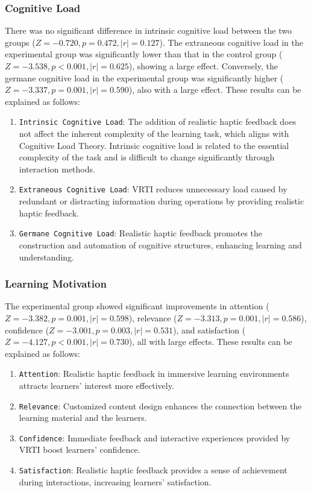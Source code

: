 \documentclass[runningheads]{llncs}
\begin{document}
\subsubsection{Cognitive Load}
There was no significant difference in intrinsic cognitive load between the two groups ($Z=-0.720, p=0.472, |r|=0.127$). The extraneous cognitive load in the experimental group was significantly lower than that in the control group ($Z=-3.538, p<0.001, |r|=0.625$), showing a large effect. Conversely, the germane cognitive load in the experimental group was significantly higher ($Z=-3.337, p=0.001, |r|=0.590$), also with a large effect. These results can be explained as follows:

\begin{enumerate}
\item {\texttt{Intrinsic Cognitive Load}}: The addition of realistic haptic feedback does not affect the inherent complexity of the learning task, which aligns with Cognitive Load Theory. Intrinsic cognitive load is related to the essential complexity of the task and is difficult to change significantly through interaction methods.

\item {\texttt{Extraneous Cognitive Load}}: VRTI reduces unnecessary load caused by redundant or distracting information during operations by providing realistic haptic feedback.

\item {\texttt{Germane Cognitive Load}}: Realistic haptic feedback promotes the construction and automation of cognitive structures, enhancing learning and understanding.
\end{enumerate}

\subsubsection{Learning Motivation}
The experimental group showed significant improvements in attention ($Z=-3.382, p=0.001, |r|=0.598$), relevance ($Z=-3.313, p=0.001, |r|=0.586$), confidence ($Z=-3.001, p=0.003, |r|=0.531$), and satisfaction ($Z=-4.127, p<0.001, |r|=0.730$), all with large effects. These results can be explained as follows:

\begin{enumerate}
  \item {\texttt{Attention}}: Realistic haptic feedback in immersive learning environments attracts learners' interest more effectively.

  \item {\texttt{Relevance}}: Customized content design enhances the connection between the learning material and the learners.

  \item {\texttt{Confidence}}: Immediate feedback and interactive experiences provided by VRTI boost learners' confidence.

  \item {\texttt{Satisfaction}}: Realistic haptic feedback provides a sense of achievement during interactions, increasing learners' satisfaction.
\end{enumerate}
\end{document}
